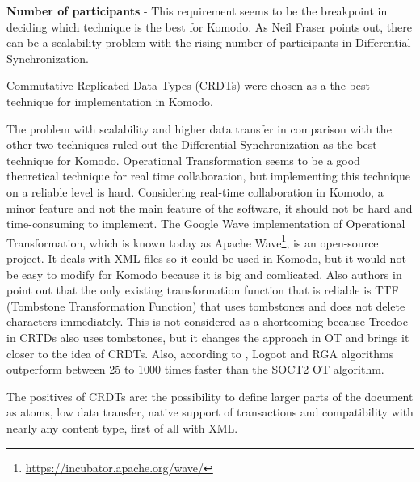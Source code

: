 \documentclass[12pt,oneside]{fithesis2}
\begin{document}
\vspace{3mm} 

\textbf{Number of participants} - This requirement seems to be the breakpoint in deciding which technique is the best for Komodo. As Neil Fraser \cite{Fraser} points out, there can be a scalability problem with the rising number of participants in Differential Synchronization.

\vspace{3mm} 

Commutative Replicated Data Types (CRDTs) were chosen as a the best technique for implementation in Komodo. 
\par The problem with scalability and higher data transfer in comparison with the other two techniques ruled out the Differential Synchronization as the best technique for Komodo. Operational Transformation seems to be a good theoretical technique for real time collaboration, but implementing this technique on a reliable level is hard. Considering real-time collaboration in Komodo, a minor feature and not the main feature of the software, it should not be hard and time-consuming to implement. The Google Wave implementation of Operational Transformation, which is known today as Apache Wave\footnote{\url{https://incubator.apache.org/wave/}}, is an open-source project. It deals with XML files so it could be used in Komodo, but it would not be easy to modify for Komodo because it is big and comlicated. Also authors in \cite{CRDT-real} point out that the only existing transformation function that is reliable is TTF (Tombstone Transformation Function)\cite{ttf} that uses tombstones and does not delete characters immediately. This is not considered as a shortcoming because Treedoc in CRTDs also uses tombstones, but it changes the approach in OT and brings it closer to the idea of CRDTs. Also, according to \cite{CRDT-real}, Logoot and RGA algorithms outperform between 25 to 1000 times faster than the SOCT2 OT algorithm.
\par The positives of CRDTs are: the possibility to define larger parts of the document as atoms, low data transfer, native support of transactions and compatibility with nearly any content type, first of all with XML. 
\end{document}
